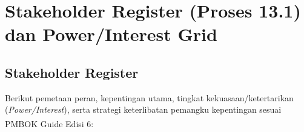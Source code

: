 \documentclass[11pt,a4paper]{article}
\begin{document}
\clearpage

\section{Stakeholder Register (Proses 13.1) dan Power/Interest Grid}

\subsection{Stakeholder Register}
Berikut pemetaan peran, kepentingan utama, tingkat kekuasaan/ketertarikan (\textit{Power/Interest}), serta strategi keterlibatan pemangku kepentingan sesuai PMBOK\textsuperscript{\textregistered} Guide Edisi 6:
\end{document}
